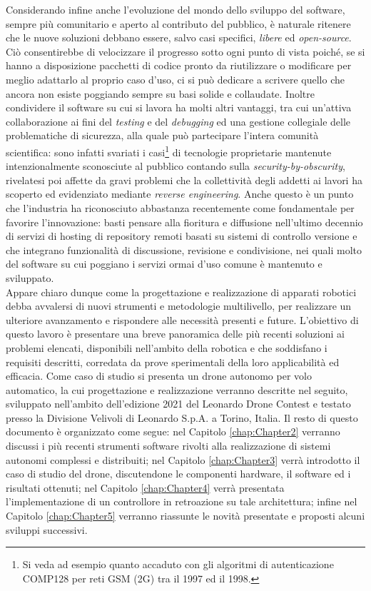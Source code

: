 Considerando infine anche l'evoluzione del mondo dello sviluppo del software, sempre più comunitario e aperto al contributo del pubblico, è naturale ritenere che le nuove soluzioni debbano essere, salvo casi specifici, \emph{libere} ed \emph{open-source}. Ciò consentirebbe di velocizzare il progresso sotto ogni punto di vista poiché, se si hanno a disposizione pacchetti di codice pronto da riutilizzare o modificare per meglio adattarlo al proprio caso d'uso, ci si può dedicare a scrivere quello che ancora non esiste poggiando sempre su basi solide e collaudate. Inoltre condividere il software su cui si lavora ha molti altri vantaggi, tra cui un'attiva collaborazione ai fini del \emph{testing} e del \emph{debugging} ed una gestione collegiale delle problematiche di sicurezza, alla quale può partecipare l'intera comunità scientifica: sono infatti svariati i casi\footnote{Si veda ad esempio quanto accaduto con gli algoritmi di autenticazione COMP128 per reti GSM (2G) tra il 1997 ed il 1998.} di tecnologie proprietarie mantenute intenzionalmente sconosciute al pubblico contando sulla \emph{security-by-obscurity}, rivelatesi poi affette da gravi problemi che la collettività degli addetti ai lavori ha scoperto ed evidenziato mediante \emph{reverse engineering}. Anche questo è un punto che l'industria ha riconosciuto abbastanza recentemente come fondamentale per favorire l'innovazione: basti pensare alla fioritura e diffusione nell'ultimo decennio di servizi di hosting di repository remoti basati su sistemi di controllo versione e che integrano funzionalità di discussione, revisione e condivisione, nei quali molto del software su cui poggiano i servizi ormai d'uso comune è mantenuto e sviluppato.\\
Appare chiaro dunque come la progettazione e realizzazione di apparati robotici debba avvalersi di nuovi strumenti e metodologie multilivello, per realizzare un ulteriore avanzamento e rispondere alle necessità presenti e future. L'obiettivo di questo lavoro è presentare una breve panoramica delle più recenti soluzioni ai problemi elencati, disponibili nell'ambito della robotica e che soddisfano i requisiti descritti, corredata da prove sperimentali della loro applicabilità ed efficacia. Come caso di studio si presenta un drone autonomo per volo automatico, la cui progettazione e realizzazione verranno descritte nel seguito, sviluppato nell'ambito dell'edizione 2021 del Leonardo Drone Contest e testato presso la Divisione Velivoli di Leonardo S.p.A. a Torino, Italia.\newpage
Il resto di questo documento è organizzato come segue: nel Capitolo \ref{chap:Chapter2} verranno discussi i più recenti strumenti software rivolti alla realizzazione di sistemi autonomi complessi e distribuiti; nel Capitolo \ref{chap:Chapter3} verrà introdotto il caso di studio del drone, discutendone le componenti hardware, il software ed i risultati ottenuti; nel Capitolo \ref{chap:Chapter4} verrà presentata l'implementazione di un controllore in retroazione su tale architettura; infine nel Capitolo \ref{chap:Chapter5} verranno riassunte le novità presentate e proposti alcuni sviluppi successivi.
